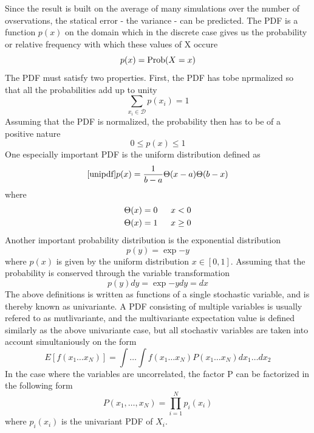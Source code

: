 \documentclass[%
reprint,
amsmath,amssymb,
aps,
]{revtex4-1}
\begin{document}
Since the result is built on the average of many simulations over the number of ovservations, the statical error - the variance - can be predicted. The PDF is a function $p(x)$ on the domain which in the discrete case gives us the probability or relative frequency with which these values of X occure 
\begin{equation}
	p(x) = \textnormal{Prob}(X=x)
\end{equation}
The PDF must satisfy two properties. First, the PDF has tobe nprmalized so that all the probabilities add up to unity
\begin{equation}
	\sum_{x_i\in \mathcal{D}} p(x_i) = 1
\end{equation} 
Assuming that the PDF is normalized, the probability then has to be of a positive nature 
\begin{equation}
	0 \leq p(x) \leq 1
\end{equation}
One especially important PDF is the uniform distribution defined as 
\begin{equation}\ref{unipdf}
	p(x) = \dfrac{1}{b-a}\Theta(x-a)\Theta(b-x)
\end{equation}
where
\begin{align*}
	\Theta(x) &= 0& \hspace{2mm} x < 0\\
	\Theta(x) &= 1& \hspace{2mm} x \geq 0\\
\end{align*}
Another important probability distribution is the exponential distribution 
\begin{equation}\label{exppdf}
	p(y) = \exp{-y}
\end{equation}
where $p(x)$ is given by the uniform distribution $x\in[0,1]$. Assuming that the probability is conserved through the variable transformation
\begin{equation}
p(y)dy = \exp{-y}dy = dx
\end{equation}
The above definitions is written as functions of a single stochastic variable, and is thereby known as univariante. A PDF consisting of multiple variables is usually refered to as mutlivariante, and the multivariante expectation value is defined similarly as the above univariante case, but all stochastiv variables are taken into account simultaniously on the form
\begin{equation}
	E[f(x_1\dots x_N)] = \int\dots\int f(x_1\dots x_N)P(x_1\dots x_N)dx_1\dots dx_2
\end{equation}
In the case where the variables are uncorrelated, the factor P can be factorized in the following form
\begin{equation}
	P(x_1,\dots,x_N) = \prod_{i = 1}^{N} p_i(x_i)
\end{equation}
where $p_i(x_i)$ is the univariant PDF of $X_i$.
\end{document}
